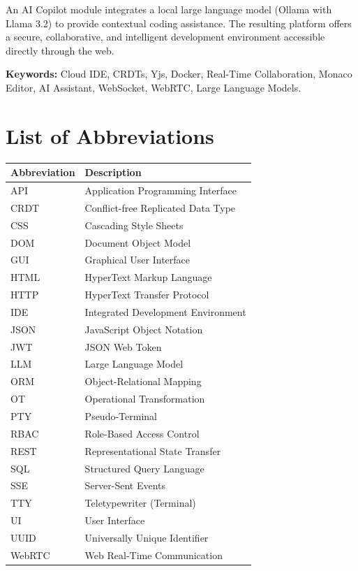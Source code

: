 \documentclass[12pt,a4paper,oneside]{report}
\begin{document}
An AI Copilot module integrates a local large language model (Ollama with Llama 3.2) to provide contextual coding assistance. The resulting platform offers a secure, collaborative, and intelligent development environment accessible directly through the web.

\vspace{1cm}
\noindent\textbf{Keywords:} Cloud IDE, CRDTs, Yjs, Docker, Real-Time Collaboration, Monaco Editor, AI Assistant, WebSocket, WebRTC, Large Language Models.

\newpage
\tableofcontents

\newpage
\listoffigures
{}

\newpage
\listoftables
{}

\newpage
\lstlistoflistings
{}

\newpage
\chapter*{List of Abbreviations}

\begin{tabularx}{\textwidth}{lX}
\toprule
\textbf{Abbreviation} & \textbf{Description} \\
\midrule
API & Application Programming Interface \\
CRDT & Conflict-free Replicated Data Type \\
CSS & Cascading Style Sheets \\
DOM & Document Object Model \\
GUI & Graphical User Interface \\
HTML & HyperText Markup Language \\
HTTP & HyperText Transfer Protocol \\
IDE & Integrated Development Environment \\
JSON & JavaScript Object Notation \\
JWT & JSON Web Token \\
LLM & Large Language Model \\
ORM & Object-Relational Mapping \\
OT & Operational Transformation \\
PTY & Pseudo-Terminal \\
RBAC & Role-Based Access Control \\
REST & Representational State Transfer \\
SQL & Structured Query Language \\
SSE & Server-Sent Events \\
TTY & Teletypewriter (Terminal) \\
UI & User Interface \\
UUID & Universally Unique Identifier \\
WebRTC & Web Real-Time Communication \\
\bottomrule
\end{tabularx}
\end{document}
